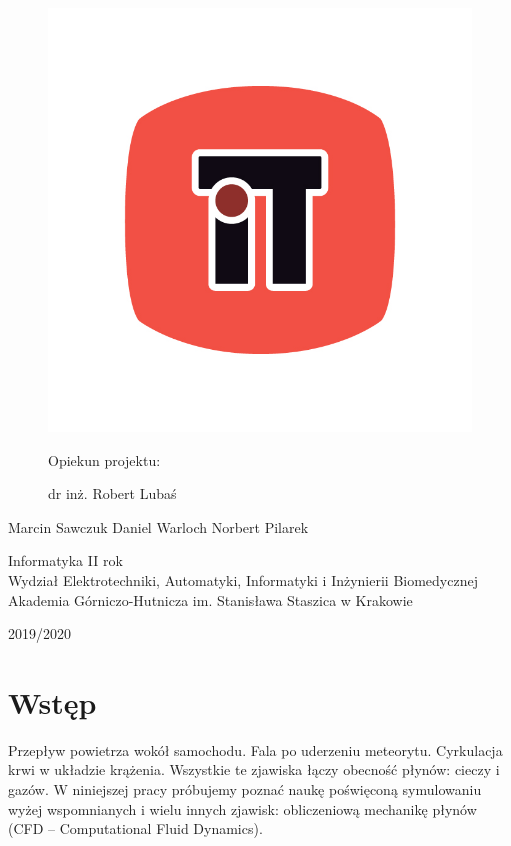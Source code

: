 \documentclass{article}
\begin{document}
\begin{figure}[h]
		\includegraphics[scale = 0.65]{IT.jpg}
		
		\vspace{15mm}
		
		\centering
		\large Opiekun projektu:
		
		\Large dr inż. Robert Lubaś
	\end{figure}
	
	\vspace{25mm}
	\begin{center}
		\Large{Marcin Sawczuk \hspace{5mm} Daniel Warloch \hspace{5mm} Norbert Pilarek }
	\end{center}
	\vspace{12mm}
	\begin{center}
		\large{Informatyka II rok \\ Wydział Elektrotechniki, Automatyki,
			Informatyki i Inżynierii Biomedycznej \\
			Akademia Górniczo-Hutnicza im. Stanisława Staszica
			w Krakowie} 
		
		\medskip
		\Large{2019/2020}
	\end{center}
	
	\pagebreak
	\tableofcontents
	\pagebreak
	
	\section{Wstęp}
	Przepływ powietrza wokół samochodu. Fala po uderzeniu meteorytu. Cyrkulacja krwi w układzie krążenia. Wszystkie te zjawiska łączy obecność płynów: cieczy i gazów. W niniejszej pracy próbujemy poznać naukę poświęconą symulowaniu wyżej wspomnianych i wielu innych zjawisk: obliczeniową mechanikę płynów (CFD – Computational Fluid Dynamics).
	
\end{document}

